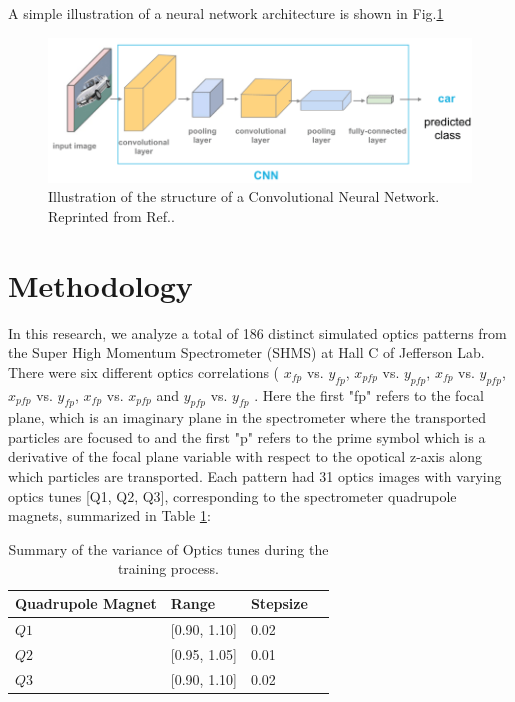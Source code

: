 \documentclass[conference]{IEEEtran}
\begin{document}
A simple illustration of a neural network architecture is shown in Fig.\ref{fig:CNN_Image} 
\begin{figure}[h]
 \centering
  \includegraphics[scale=0.3]{images/ConvolutionalNeuralNetwork.png}
  \caption{Illustration of the structure of a Convolutional Neural Network. 
\\ \centering Reprinted from Ref.\cite{CNN_Image}.}
  \label{fig:CNN_Image}
\end{figure}



\section{Methodology}
In this research, we analyze a total of 186 distinct simulated optics patterns from the Super High Momentum Spectrometer (SHMS) at Hall C of Jefferson Lab.
There were six different optics correlations ( $x_{fp}$ vs. $y_{fp}$,  $x_{pfp}$ vs. $y_{pfp}$, $x_{fp}$ vs. $y_{pfp}$,  $x_{pfp}$ vs. $y_{fp}$, $x_{fp}$ vs. $x_{pfp}$ and  $y_{pfp}$ vs. $y_{fp}$ . Here the first "fp" refers to the focal plane, which is an imaginary plane in the spectrometer where the transported particles are focused to and the first "p" refers to the prime symbol which is a derivative of the focal plane variable with respect to the opotical z-axis along which particles are transported. Each pattern had 31 optics images with varying optics tunes [Q1, Q2, Q3], corresponding to the spectrometer quadrupole magnets, summarized in Table \ref{tab:tune_stpSize}:

\begin{table}[ht!]
	\begin{center}
		\begin{tabular}{llll} %
                  \hline
                  Quadrupole Magnet & Range & Stepsize \\
                  \hline\hline
	          $Q1$ & [0.90, 1.10] & 0.02  \\
                  $Q2$ & [0.95, 1.05] & 0.01  \\
                  $Q3$ & [0.90, 1.10] & 0.02  \\                       
                  \hline 
		\end{tabular}
	\end{center}
	\caption{Summary of the variance of Optics tunes during the training process.}
	\label{tab:tune_stpSize}
\end{table}
\end{document}
